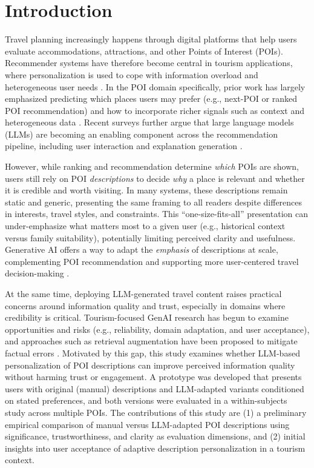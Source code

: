 \section{Introduction}
Travel planning increasingly happens through digital platforms that help users evaluate accommodations, attractions, and other Points of Interest (POIs). Recommender systems have therefore become central in tourism applications, where personalization is used to cope with information overload and heterogeneous user needs \cite{adomavicius_toward_2005,renjith_extensive_2020}. In the POI domain specifically, prior work has largely emphasized predicting which places users may prefer (e.g., next-POI or ranked POI recommendation) and how to incorporate richer signals such as context and heterogeneous data \cite{wang_survey_2025,Li2024SIGIR_LLMNextPOI}. Recent surveys further argue that large language models (LLMs) are becoming an enabling component across the recommendation pipeline, including user interaction and explanation generation \cite{Zhao2024TKDE_LLMRecSysEra,wang_embracing_2024,wang_point--interest_2025}.

However, while ranking and recommendation determine \emph{which} POIs are shown, users still rely on POI \emph{descriptions} to decide \emph{why} a place is relevant and whether it is credible and worth visiting. In many systems, these descriptions remain static and generic, presenting the same framing to all readers despite differences in interests, travel styles, and constraints. This “one-size-fits-all” presentation can under-emphasize what matters most to a given user (e.g., historical context versus family suitability), potentially limiting perceived clarity and usefulness. Generative AI offers a way to adapt the \emph{emphasis} of descriptions at scale, complementing POI recommendation and supporting more user-centered travel decision-making \cite{li_generative_2025,zhang_co-creating_2024}.

At the same time, deploying LLM-generated travel content raises practical concerns around information quality and trust, especially in domains where credibility is critical. Tourism-focused GenAI research has begun to examine opportunities and risks (e.g., reliability, domain adaptation, and user acceptance), and approaches such as retrieval augmentation have been proposed to mitigate factual errors \cite{hsu_fine-tuned_2024,qi_rag-optimized_2025,li_generative_2025}. Motivated by this gap, this study examines whether LLM-based personalization of POI descriptions can improve perceived information quality without harming trust or engagement. A prototype was developed that presents users with original (manual) descriptions and LLM-adapted variants conditioned on stated preferences, and both versions were evaluated in a within-subjects study across multiple POIs. The contributions of this study are (1) a preliminary empirical comparison of manual versus LLM-adapted POI descriptions using significance, trustworthiness, and clarity as evaluation dimensions, and (2) initial insights into user acceptance of adaptive description personalization in a tourism context.

